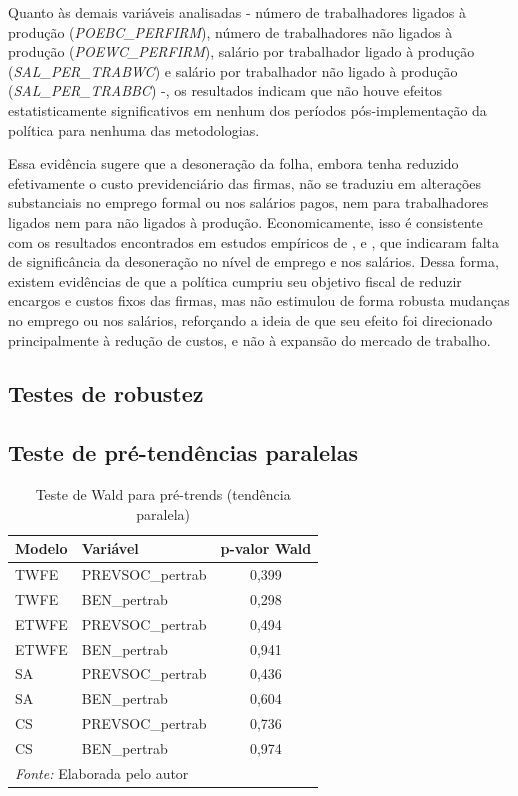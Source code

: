 \documentclass[12pt,a4paper,oneside]{article}
\begin{document}
		Quanto às demais variáveis analisadas - número de trabalhadores ligados à produção (\textit{POEBC\_PERFIRM}), número de trabalhadores não ligados à produção (\textit{POEWC\_PERFIRM}), salário por trabalhador ligado à produção (\textit{SAL\_PER\_TRABWC}) e salário por trabalhador não ligado à produção (\textit{SAL\_PER\_TRABBC}) -, os resultados indicam que não houve efeitos estatisticamente significativos em nenhum dos períodos pós-implementação da política para nenhuma das metodologias. 
		
		Essa evidência sugere que a desoneração da folha, embora tenha reduzido efetivamente o custo previdenciário das firmas, não se traduziu em alterações substanciais no emprego formal ou nos salários pagos, nem para trabalhadores ligados nem para não ligados à produção. Economicamente, isso é consistente com os resultados encontrados em estudos empíricos de \citet{docarmo2012}, \citet{Dallava2014} e \citet{Garcia2018}, que indicaram falta de significância da desoneração no nível de emprego e nos salários. Dessa forma, existem evidências de que a política cumpriu seu objetivo fiscal de reduzir encargos e custos fixos das firmas, mas não estimulou de forma robusta mudanças no emprego ou nos salários, reforçando a ideia de que seu efeito foi direcionado principalmente à redução de custos, e não à expansão do mercado de trabalho.
				
		\subsection{Testes de robustez}
		
		\subsection{Teste de pré-tendências paralelas}
		
		\begin{table}[H]
			\centering
			\caption{Teste de Wald para pré-trends (tendência paralela)}
			\label{tab:wald_pretrend}
			\begin{tabular}{l l c}
				\hline
				\textbf{Modelo} & \textbf{Variável} & \textbf{p-valor Wald} \\
				\hline
				TWFE   & PREVSOC\_pertrab & 0,399 \\
				TWFE   & BEN\_pertrab     & 0,298 \\
				ETWFE  & PREVSOC\_pertrab & 0,494 \\
				ETWFE  & BEN\_pertrab     & 0,941 \\
				SA     & PREVSOC\_pertrab & 0,436 \\
				SA     & BEN\_pertrab     & 0,604 \\
				CS     & PREVSOC\_pertrab & 0,736 \\
				CS     & BEN\_pertrab     & 0,974 \\
				\hline
				\multicolumn{3}{l}{\footnotesize \textit{Fonte:} Elaborada pelo autor} \\
			\end{tabular}
		\end{table}
		
\end{document}
